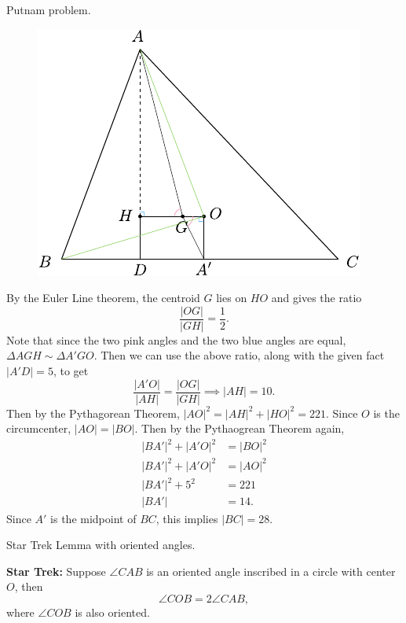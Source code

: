 \documentclass[twoside,10pt]{article}
\begin{document}
\newpage

\begin{exer}[1.100]
Putnam problem.
\end{exer}

\begin{figure}[H]
	\centering
	\includegraphics[scale=1]{fig/100.pdf}
\end{figure}

By the Euler Line theorem, the centroid $G$ lies on $HO$ and gives the ratio
\[
\frac{|OG|}{|GH|} = \frac{1}{2} .
\] Note that since the two pink angles and the two blue angles are equal, $\Delta AGH \sim \Delta A'GO$. Then we can use the above ratio, along with the given fact $|A'D|=5$, to get
\[
\frac{|A'O|}{|AH|} = \frac{|OG|}{|GH|} \implies |AH| = 10.
\] Then by the Pythagorean Theorem, $|AO|^2 = |AH|^2 + |HO|^2 = 221$. Since $O$ is the circumcenter, $|AO|=|BO|$. Then by the Pythaogrean Theorem again,
\begin{align*}
	|BA'|^2 + |A'O|^2 &= |BO|^2 \\
	|BA'|^2 + |A'O|^2 &= |AO|^2 \\
	|BA'|^2 + 5^2 &= 221 \\
	|BA'| &= 14.
\end{align*}
Since $A'$ is the midpoint of $ BC$, this implies $|BC|=28$.
\newpage

\begin{exer}[1.107]
Star Trek Lemma with oriented angles.
\end{exer}

\textbf{Star Trek:} Suppose $\angle CAB$ is an oriented angle inscribed in a circle with center $O$, then
\[
\angle COB = 2 \angle CAB,
\] where $\angle COB$ is also oriented.
\end{document}

